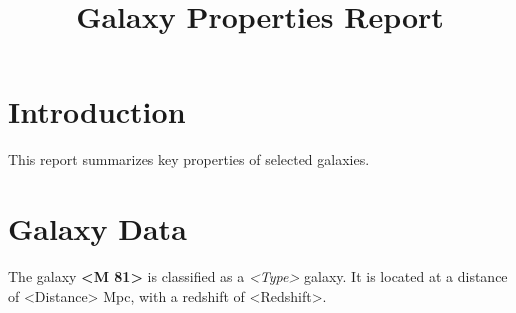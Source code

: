 \documentclass{article}
\title{Galaxy Properties Report}
\author{}
\date{}
\begin{document}
\maketitle

\section{Introduction}
This report summarizes key properties of selected galaxies.

\section{Galaxy Data}
The galaxy \textbf{<M 81>} is classified as a \textit{<Type>} galaxy. 
It is located at a distance of <Distance> Mpc, with a redshift of <Redshift>.
\end{document}
